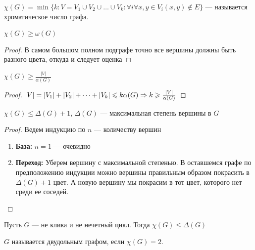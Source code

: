 

\begin{definition}
    \(\chi(G) = \min\{k: V = V_1 \cup V_2 \cup \dots \cup V_k: \forall i \forall x, y \in V_i (x, y) \notin E\}\) --- называется хроматическое число графа.
\end{definition}

\begin{proposition}
    \(\chi(G) \ge \omega(G)\)
\end{proposition}
\begin{proof}
    В самом большом полном подграфе точно все вершины должны быть разного цвета, откуда и следует оценка
\end{proof}

\begin{proposition}
    \(\chi(G) \ge \frac{|V|}{\alpha(G)}\)
\end{proposition}
\begin{proof}
    \(|V| = |V_1| + |V_2| + \dots + |V_k| \leqslant k\alpha(G) \Rightarrow k \geqslant \frac{|V|}{\alpha(G)}\)
\end{proof}

\begin{proposition}
    \(\chi(G) \le \Delta(G) + 1\), \(\Delta(G)\) --- максимальная степень вершины в \(G\)
\end{proposition}
\begin{proof}
    Ведем индукцию по \(n\) --- количеству вершин
    \begin{enumerate}
        \item[] \textbf{База:} \(n = 1\) --- очевидно
        \item[] \textbf{Переход:} Уберем вершину с максимальной степенью. В оставшемся графе по предположению индукции можно вершины правильным образом покрасить в \(\Delta(G) + 1\) цвет. А новую вершину мы покрасим в тот цвет, которого нет среди ее соседей.
    \end{enumerate}
\end{proof}

\begin{theorem}[Брукса]
    Пусть \(G\) --- не клика и не нечетный цикл. Тогда \(\chi(G) \le \Delta(G)\)
\end{theorem}

\begin{definition}
    \(G\) называется двудольным графом, если \(\chi(G) = 2\).
\end{definition}

